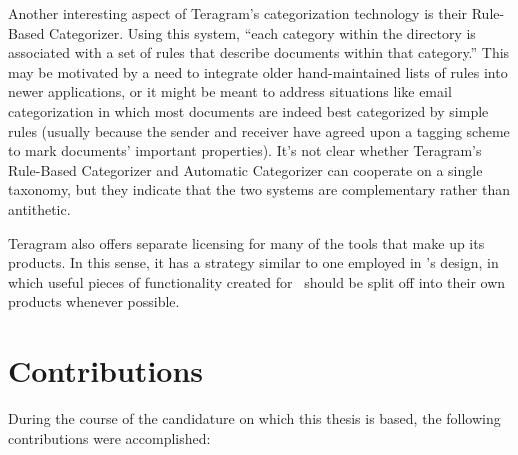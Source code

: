 Another interesting aspect of Teragram's categorization technology is
their Rule-Based Categorizer.  Using this system, ``each category
within the directory is associated with a set of rules that describe
documents within that category.''  This may be motivated by a need to
integrate older hand-maintained lists of rules into newer
applications, or it might be meant to address situations like email
categorization in which most documents are indeed best categorized by
simple rules (usually because the sender and receiver have agreed upon
a tagging scheme to mark documents' important properties).  It's not
clear whether Teragram's Rule-Based Categorizer and Automatic
Categorizer can cooperate on a single taxonomy, but they indicate that
the two systems are complementary rather than antithetic.

Teragram also offers separate licensing for many of the tools that
make up its products.  In this sense, it has a strategy similar to one
employed in \aicat's design, in which useful pieces of
functionality created for \aicat\ should be split off into
their own products whenever possible.

\section{Contributions}

During the course of the candidature on which this thesis is based,
the following contributions were accomplished:

